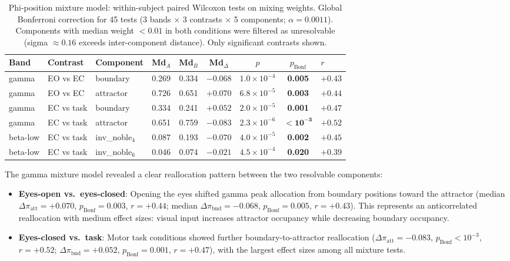 \documentclass[11pt,a4paper]{article}
\begin{document}
\begin{table}[H]
\centering
\caption{Phi-position mixture model: within-subject paired Wilcoxon tests on mixing weights. Global Bonferroni correction for 45 tests (3 bands $\times$ 3 contrasts $\times$ 5 components; $\alpha = 0.0011$). Components with median weight $< 0.01$ in both conditions were filtered as unresolvable (sigma $\approx 0.16$ exceeds inter-component distance). Only significant contrasts shown.}
\label{tab:mixture}
\begin{tabular}{@{}lllcccccl@{}}
\toprule
Band & Contrast & Component & Md$_A$ & Md$_B$ & Md$_\Delta$ & $p$ & $p_{\text{Bonf}}$ & $r$ \\
\midrule
gamma & EO vs EC & boundary & 0.269 & 0.334 & $-0.068$ & $1.0\!\times\!10^{-4}$ & \textbf{0.005} & $+0.43$ \\
gamma & EO vs EC & attractor & 0.726 & 0.651 & $+0.070$ & $6.8\!\times\!10^{-5}$ & \textbf{0.003} & $+0.44$ \\
\midrule
gamma & EC vs task & boundary & 0.334 & 0.241 & $+0.052$ & $2.0\!\times\!10^{-5}$ & \textbf{0.001} & $+0.47$ \\
gamma & EC vs task & attractor & 0.651 & 0.759 & $-0.083$ & $2.3\!\times\!10^{-6}$ & $\mathbf{< 10^{-3}}$ & $+0.52$ \\
\midrule
beta-low & EC vs task & inv\_noble$_4$ & 0.087 & 0.193 & $-0.070$ & $4.0\!\times\!10^{-5}$ & \textbf{0.002} & $+0.45$ \\
beta-low & EC vs task & inv\_noble$_6$ & 0.046 & 0.074 & $-0.021$ & $4.5\!\times\!10^{-4}$ & \textbf{0.020} & $+0.39$ \\
\bottomrule
\end{tabular}
\end{table}

The gamma mixture model revealed a clear reallocation pattern between the two resolvable components:
\begin{itemize}
    \item \textbf{Eyes-open vs.\ eyes-closed}: Opening the eyes shifted gamma peak allocation from boundary positions toward the attractor (median $\Delta\pi_{\text{att}} = +0.070$, $p_{\text{Bonf}} = 0.003$, $r = +0.44$; median $\Delta\pi_{\text{bnd}} = -0.068$, $p_{\text{Bonf}} = 0.005$, $r = +0.43$). This represents an anticorrelated reallocation with medium effect sizes: visual input increases attractor occupancy while decreasing boundary occupancy.
    \item \textbf{Eyes-closed vs.\ task}: Motor task conditions showed further boundary-to-attractor reallocation ($\Delta\pi_{\text{att}} = -0.083$, $p_{\text{Bonf}} < 10^{-3}$, $r = +0.52$; $\Delta\pi_{\text{bnd}} = +0.052$, $p_{\text{Bonf}} = 0.001$, $r = +0.47$), with the largest effect sizes among all mixture tests.
\end{itemize}
\end{document}
